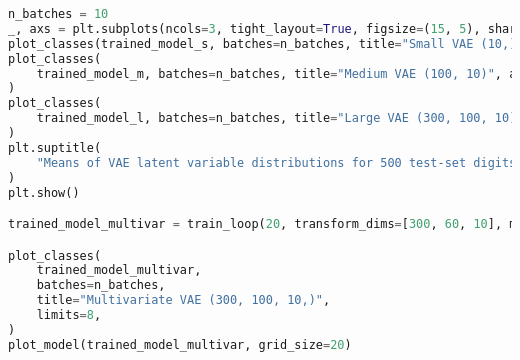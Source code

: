 \documentclass[11pt]{article} %
\begin{document}
\begin{lstlisting}[language=Python]
n_batches = 10
_, axs = plt.subplots(ncols=3, tight_layout=True, figsize=(15, 5), sharey=True)
plot_classes(trained_model_s, batches=n_batches, title="Small VAE (10,)", ax=axs[0])
plot_classes(
    trained_model_m, batches=n_batches, title="Medium VAE (100, 10)", ax=axs[1]
)
plot_classes(
    trained_model_l, batches=n_batches, title="Large VAE (300, 100, 10)", ax=axs[2]
)
plt.suptitle(
    "Means of VAE latent variable distributions for 500 test-set digits, colored by digit"
)
plt.show()

trained_model_multivar = train_loop(20, transform_dims=[300, 60, 10], multivariate=True)

plot_classes(
    trained_model_multivar,
    batches=n_batches,
    title="Multivariate VAE (300, 100, 10,)",
    limits=8,
)
plot_model(trained_model_multivar, grid_size=20)
\end{lstlisting}
\end{document}
